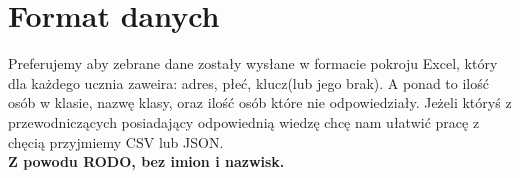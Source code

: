 \section{Format danych}

Preferujemy aby zebrane dane zostały wysłane w formacie pokroju Excel, który dla każdego ucznia zaweira: adres, płeć, klucz(lub jego brak). A ponad to ilość osób w klasie, nazwę klasy, oraz ilość osób które nie odpowiedziały. Jeżeli któryś z przewodniczących posiadający odpowiednią wiedzę chcę nam ułatwić pracę z chęcią przyjmiemy CSV lub JSON.\\ \textbf{Z powodu RODO, bez imion i nazwisk.}
